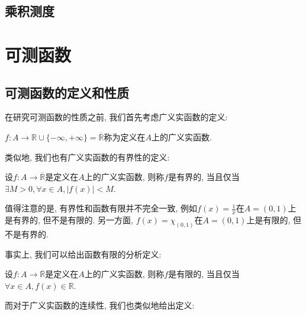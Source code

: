 \documentclass[theorem=false,mathfont=none,openany,sub3section]{easybook}
\newcommand{\btocgroup}[1][toc]{\addtocontents{#1}{\string\begingroup}}
\newcommand{\etocgroup}[1][toc]{\addtocontents{#1}{\string\endgroup}}
\begin{document}
\newpage

\section{乘积测度}

\btocgroup
{}
\chapter{可测函数}
\etocgroup

\section{可测函数的定义和性质}

在研究可测函数的性质之前, 我们首先考虑广义实函数的定义:\par

\begin{definition}
  $f:A\rightarrow \mathbb{R}\cup\{-\infty,+\infty\}=\overline{\mathbb{R} }$称为定义在$A$上的广义实函数.\par
\end{definition}

类似地, 我们也有广义实函数的有界性的定义:\par

\begin{definition}
  设$f:A\rightarrow \overline{\mathbb{R} }$是定义在$A$上的广义实函数, 则称$f$是有界的, 当且仅当$\exists M>0, \forall x\in A, |f(x)|<M$.\par
\end{definition}

\begin{remark}
  值得注意的是, 有界性和函数有限并不完全一致, 例如$f(x)=\frac{1}{x}$在$A=(0,1)$上是有界的, 但不是有限的. 另一方面, $f(x)=\chi_{(0,1)}$在$A=(0,1)$上是有限的, 但不是有界的.\par
\end{remark}

事实上, 我们可以给出函数有限的分析定义:\par

\begin{definition}
  设$f:A\rightarrow \overline{\mathbb{R} }$是定义在$A$上的广义实函数, 则称$f$是有限的, 当且仅当$\forall x\in A, f(x)\in \mathbb{R}$.\par
\end{definition}

而对于广义实函数的连续性, 我们也类似地给出定义:\par
\end{document}

